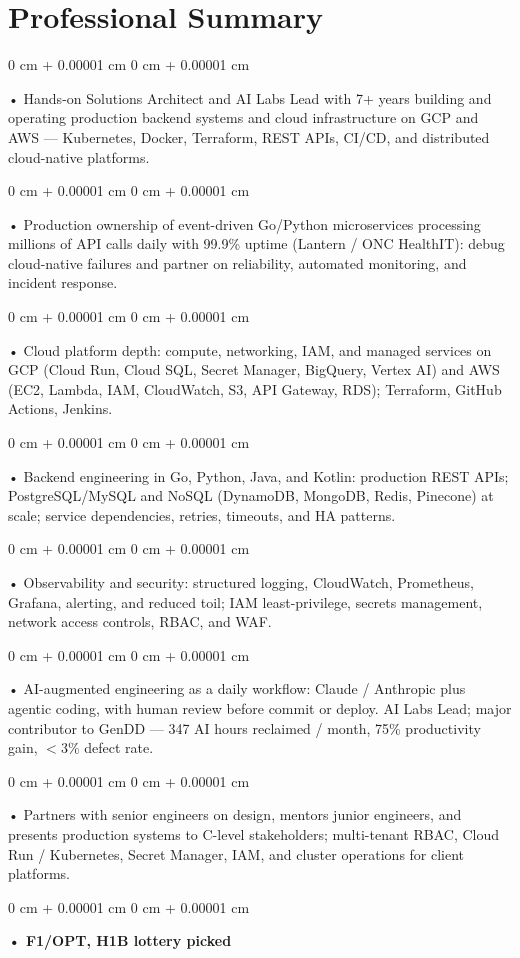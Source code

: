 \documentclass[10pt, letterpaper]{article}
\newenvironment{onecolentry}{
    \begin{adjustwidth}{
        0 cm + 0.00001 cm
    }{
        0 cm + 0.00001 cm
    }
}{
    \end{adjustwidth}
} %
\begin{document}
    \section{Professional Summary}
        \vspace{2 pt }
        \begin{onecolentry}
            • Hands-on Solutions Architect and AI Labs Lead with 7+ years building and operating production backend systems and cloud infrastructure on GCP and AWS --- Kubernetes, Docker, Terraform, REST APIs, CI/CD, and distributed cloud-native platforms.
        \end{onecolentry}
        \begin{onecolentry}
            • Production ownership of event-driven Go/Python microservices processing millions of API calls daily with 99.9\% uptime (Lantern / ONC HealthIT): debug cloud-native failures and partner on reliability, automated monitoring, and incident response.
        \end{onecolentry}
        \begin{onecolentry}
            • Cloud platform depth: compute, networking, IAM, and managed services on GCP (Cloud Run, Cloud SQL, Secret Manager, BigQuery, Vertex AI) and AWS (EC2, Lambda, IAM, CloudWatch, S3, API Gateway, RDS); Terraform, GitHub Actions, Jenkins.
        \end{onecolentry}
        \begin{onecolentry}
            • Backend engineering in Go, Python, Java, and Kotlin: production REST APIs; PostgreSQL/MySQL and NoSQL (DynamoDB, MongoDB, Redis, Pinecone) at scale; service dependencies, retries, timeouts, and HA patterns.
        \end{onecolentry}
        \begin{onecolentry}
            • Observability and security: structured logging, CloudWatch, Prometheus, Grafana, alerting, and reduced toil; IAM least-privilege, secrets management, network access controls, RBAC, and WAF.
        \end{onecolentry}
        \begin{onecolentry}
            • AI-augmented engineering as a daily workflow: Claude / Anthropic plus agentic coding, with human review before commit or deploy. AI Labs Lead; major contributor to GenDD --- 347 AI hours reclaimed / month, 75\% productivity gain, $<$3\% defect rate.
        \end{onecolentry}
        \begin{onecolentry}
            • Partners with senior engineers on design, mentors junior engineers, and presents production systems to C-level stakeholders; multi-tenant RBAC, Cloud Run / Kubernetes, Secret Manager, IAM, and cluster operations for client platforms.
        \end{onecolentry}
        \begin{onecolentry}
                \textbf{• F1/OPT, H1B lottery picked}
        \end{onecolentry}
\end{document}
